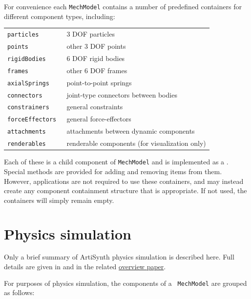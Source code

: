 For convenience each {\tt MechModel} contains a number of predefined
containers for different component types, including:

\begin{shadedregion}
\begin{tabular}{ll}
\tt particles & 3 DOF particles \\
\tt points & other 3 DOF points \\
\tt rigidBodies & 6 DOF rigid bodies \\
\tt frames & other 6 DOF frames \\
\tt axialSprings & point-to-point springs \\
\tt connectors & joint-type connectors between bodies \\
\tt constrainers & general constraints \\
\tt forceEffectors & general force-effectors \\
\tt attachments & attachments between dynamic components \\
\tt renderables & renderable components (for visualization only) \\
\end{tabular}
\end{shadedregion}
Each of these is a child component of {\tt MechModel} and is
implemented as a
. Special methods
are provided for adding and removing items from them. However,
applications are not required to use these containers, and may instead
create any component containment structure that is appropriate.
If not used, the containers will simply remain empty.

\section{Physics simulation}
\label{PhysicsSimulation:sec}

Only a brief summary of ArtiSynth physics simulation is described
here.  Full details are given in \cite{lloyd2012artisynth} and in the
related
\href{http://www.artisynth.org/doc/artisynth.pdf}{overview paper}.

For purposes of physics simulation, the components of a {\tt
MechModel} are grouped as follows:


